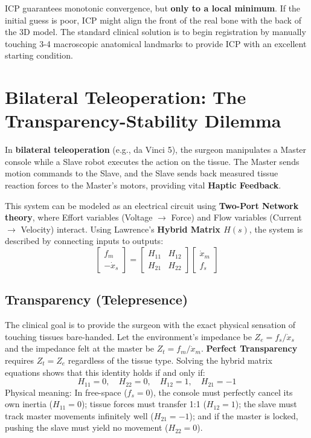 \documentclass[11pt,a4paper,twoside]{report}
\begin{document}
ICP guarantees monotonic convergence, but \textbf{only to a local minimum}. If the initial guess is poor, ICP might align the front of the real bone with the back of the 3D model. The standard clinical solution is to begin registration by manually touching 3-4 macroscopic anatomical landmarks to provide ICP with an excellent starting condition.

\chapter{Bilateral Teleoperation: The Transparency-Stability Dilemma}

In \textbf{bilateral teleoperation} (e.g., da Vinci 5), the surgeon manipulates a Master console while a Slave robot executes the action on the tissue. The Master sends motion commands to the Slave, and the Slave sends back measured tissue reaction forces to the Master's motors, providing vital \textbf{Haptic Feedback}.

This system can be modeled as an electrical circuit using \textbf{Two-Port Network theory}, where Effort variables (Voltage $\rightarrow$ Force) and Flow variables (Current $\rightarrow$ Velocity) interact.
Using Lawrence's \textbf{Hybrid Matrix $H(s)$}, the system is described by connecting inputs to outputs:
\begin{equation}
    \begin{bmatrix} f_m \\ -\dot{x}_s \end{bmatrix}
    = 
    \begin{bmatrix} H_{11} & H_{12} \\ H_{21} & H_{22} \end{bmatrix}
    \begin{bmatrix} \dot{x}_m \\ f_s \end{bmatrix}
\end{equation}

\section{Transparency (Telepresence)}
The clinical goal is to provide the surgeon with the exact physical sensation of touching tissues bare-handed. Let the environment's impedance be $Z_e = f_s/\dot{x}_s$ and the impedance felt at the master be $Z_t = f_m/\dot{x}_m$.
\textbf{Perfect Transparency} requires $Z_t = Z_e$ regardless of the tissue type. Solving the hybrid matrix equations shows that this identity holds if and only if:
\begin{equation}
    H_{11} = 0, \quad H_{22} = 0, \quad H_{12} = 1, \quad H_{21} = -1
\end{equation}
Physical meaning: In free-space ($f_s=0$), the console must perfectly cancel its own inertia ($H_{11}=0$); tissue forces must transfer 1:1 ($H_{12}=1$); the slave must track master movements infinitely well ($H_{21}=-1$); and if the master is locked, pushing the slave must yield no movement ($H_{22}=0$). 
\end{document}
